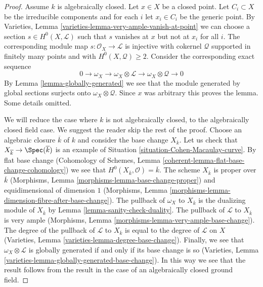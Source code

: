 \begin{proof}
Assume $k$ is algebraically closed. Let $x \in X$ be a closed point.
Let $C_i \subset X$ be the irreducible components and for each $i$
let $x_i \in C_i$ be the generic point. By
Varieties, Lemma \ref{varieties-lemma-very-ample-vanish-at-point}
we can choose a section $s \in H^0(X, \mathcal{L})$ such that $s$
vanishes at $x$ but not at $x_i$ for all $i$. The corresponding
module map $s : \mathcal{O}_X \to \mathcal{L}$ is injective with
cokernel $\mathcal{Q}$ supported in finitely many points and
with $H^0(X, \mathcal{Q}) \geq 2$. Consider the corresponding
exact sequence
$$
0 \to \omega_X \to \omega_X \otimes \mathcal{L} \to
\omega_X \otimes \mathcal{Q} \to 0
$$
By Lemma \ref{lemma-globally-generated} we see that the module generated
by global sections surjects onto $\omega_X \otimes \mathcal{Q}$.
Since $x$ was arbitrary this proves the lemma. Some details omitted.

\medskip\noindent
We will reduce the case where $k$ is not algebraically closed, to
the algebraically closed field case. We suggest the reader skip
the rest of the proof. Choose an algebraic closure $\overline{k}$
of $k$ and consider the base change $X_{\overline{k}}$. Let us
check that $X_{\overline{k}} \to \Spec(\overline{k})$ is an example
of Situation \ref{situation-Cohen-Macaulay-curve}. By flat base change
(Cohomology of Schemes, Lemma \ref{coherent-lemma-flat-base-change-cohomology})
we see that $H^0(X_{\overline{k}}, \mathcal{O}) = \overline{k}$.
The scheme $X_{\overline{k}}$ is proper over $\overline{k}$ (Morphisms,
Lemma \ref{morphisms-lemma-base-change-proper}) and
equidimensional of dimension $1$
(Morphisms, Lemma \ref{morphisms-lemma-dimension-fibre-after-base-change}).
The pullback of $\omega_X$ to $X_{\overline{k}}$ is the dualizing
module of $X_{\overline{k}}$ by Lemma \ref{lemma-sanity-check-duality}.
The pullback of $\mathcal{L}$ to $X_{\overline{k}}$ is very ample
(Morphisms, Lemma \ref{morphisms-lemma-very-ample-base-change}).
The degree of the pullback of $\mathcal{L}$ to $X_{\overline{k}}$
is equal to the degree of $\mathcal{L}$ on $X$ (Varieties, Lemma
\ref{varieties-lemma-degree-base-change}). Finally, we see that
$\omega_X \otimes \mathcal{L}$ is globally generated if and only
if its base change is so
(Varieties, Lemma \ref{varieties-lemma-globally-generated-base-change}).
In this way we see that the result follows from the result in the
case of an algebraically closed ground field.
\end{proof}






